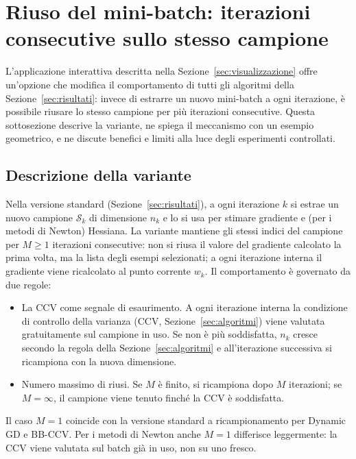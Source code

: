 \section{Riuso del mini-batch: iterazioni consecutive sullo stesso campione}\label{app:riuso}

L'applicazione interattiva descritta nella Sezione~\ref{sec:visualizzazione} offre
un'opzione che modifica il comportamento di tutti gli algoritmi della
Sezione~\ref{sec:risultati}: invece di estrarre un nuovo mini-batch a ogni
iterazione, è possibile riusare lo stesso campione per più iterazioni
consecutive. Questa sottosezione descrive la variante, ne spiega il meccanismo
con un esempio geometrico, e ne discute benefici e limiti alla luce degli
esperimenti controllati.

\subsection{Descrizione della variante}\label{app:riuso-descrizione}

Nella versione standard (Sezione~\ref{sec:risultati}), a ogni iterazione $k$
si estrae un nuovo campione $\mathcal{S}_k$ di dimensione $n_k$ e lo si usa
per stimare gradiente e (per i metodi di Newton) Hessiana. La variante
mantiene gli stessi indici del campione per $M \ge 1$ iterazioni
consecutive: non si riusa il valore del gradiente calcolato la prima volta,
ma la lista degli esempi selezionati; a ogni iterazione interna il gradiente
viene ricalcolato al punto corrente $w_k$. Il comportamento è governato da
due regole:

\begin{itemize}
\item La CCV come segnale di esaurimento. A ogni iterazione interna
  la condizione di controllo della varianza (CCV, Sezione~\ref{sec:algoritmi})
  viene valutata gratuitamente sul campione in uso. Se non è più
  soddisfatta, $n_k$ cresce secondo la regola della Sezione~\ref{sec:algoritmi}
  e all'iterazione successiva si ricampiona con la nuova dimensione.
\item Numero massimo di riusi. Se $M$ è finito, si ricampiona dopo
  $M$ iterazioni; se $M = \infty$, il campione viene tenuto finché la CCV è
  soddisfatta.
\end{itemize}

Il caso $M = 1$ coincide con la versione standard a ricampionamento per
Dynamic GD e BB-CCV. Per i metodi di Newton anche $M = 1$ differisce
leggermente: la CCV viene valutata sul batch già in uso, non su uno fresco.

